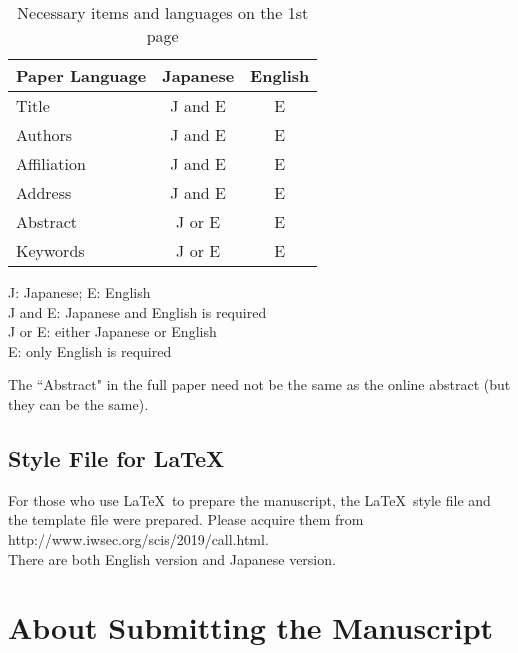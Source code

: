 \documentclass[a4paper]{article}
\begin{document}
\begin{small}
\begin{table}[htbp]
  \begin{center}
    \caption{Necessary items and languages on the 1st page}




      \begin{tabular}{l|c|c} \hline
      Paper Language   & Japanese & English \\
      \hline
      Title            & J and E  &   E     \\
      Authors          & J and E  &   E     \\
      Affiliation      & J and E  &   E     \\
      Address          & J and E  &   E     \\
      Abstract         & J or E   &   E     \\
      Keywords         & J or E   &   E     \\
      \hline
    \end{tabular}
    \label{tab:const}
  \end{center}
      J: Japanese; E: English\\
      J and E: Japanese and English is required \\
      J or E: either Japanese or English\\
      E: only English is required

\end{table}
\end{small}


The ``Abstract" in the full paper need not be the same as the online abstract (but they can be the same).

\subsection{Style File for \LaTeX}

For those who use \LaTeX\ to prepare the manuscript,
the \LaTeX\ style file and the template file were prepared. Please acquire them from \\ \mbox{http://www.iwsec.org/scis/2019/call.html}.\\
There are both English version and Japanese version.

\section{About Submitting the Manuscript}
\end{document}
